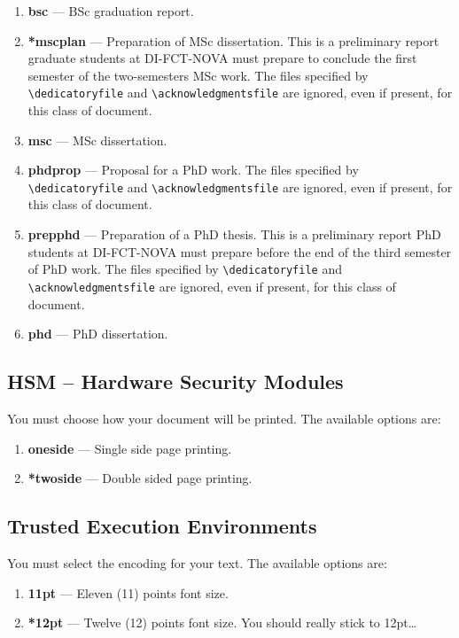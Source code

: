 \begin{enumerate}
	\item \textbf{bsc} --- BSc graduation report.
	\item \textbf{*mscplan} --- Preparation of MSc dissertation. This is a preliminary report graduate students at DI-FCT-NOVA must prepare to conclude the first semester of the two-semesters MSc work. The files specified by \verb!\dedicatoryfile! and \verb!\acknowledgmentsfile! are ignored, even if present, for this class of document.
	\item \textbf{msc} --- MSc dissertation.
	\item \textbf{phdprop} ---  Proposal for a PhD work. The files specified by \verb!\dedicatoryfile! and \verb!\acknowledgmentsfile! are ignored, even if present, for this class of document.
	\item \textbf{prepphd} ---  Preparation of a PhD thesis. This is a preliminary report PhD students at DI-FCT-NOVA must prepare before the end of the third semester of PhD work. The files specified by \verb!\dedicatoryfile! and \verb!\acknowledgmentsfile! are ignored, even if present, for this class of document.
	\item \textbf{phd} --- PhD dissertation.
\end{enumerate}

\subsection{HSM – Hardware Security Modules} %
\label{ssec:hardware_security_modules}

You must choose how your document will be printed. The available options are:
\begin{enumerate}
	\item \textbf{oneside} --- Single side page printing.
	\item \textbf{*twoside} --- Double sided page printing.
\end{enumerate}

\subsection{Trusted Execution Environments} %
\label{ssec:trusted_execution_environments}

You must select the encoding for your text. The available options are:
\begin{enumerate}
	\item \textbf{11pt} --- Eleven (11) points font size.
	\item \textbf{*12pt} --- Twelve (12) points font size. You should really stick to 12pt\ldots
\end{enumerate}

